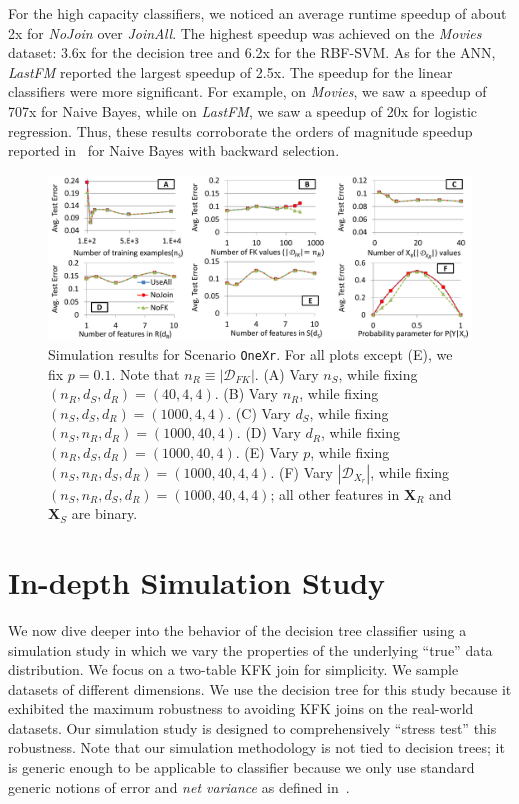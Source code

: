 \documentclass{vldb}
\begin{document}
For the high capacity classifiers, we noticed an average runtime speedup of about 2x for \textit{NoJoin} over \textit{JoinAll}.  The highest speedup was 
achieved on the \textit{Movies} dataset: 3.6x for the decision tree and 6.2x for the RBF-SVM. As for the ANN, \textit{LastFM} reported the 
largest speedup of 2.5x. 
The speedup for the linear classifiers were more significant. For example, on \textit{Movies}, we saw a speedup of 707x for Naive Bayes, while on 
\textit{LastFM}, we saw a speedup of 20x for logistic regression. Thus, these results corroborate the orders of magnitude speedup reported in~\cite{hamlet} 
for Naive Bayes with backward selection.


\begin{figure}[t]
\centering
\includegraphics[width=0.92\linewidth]{onexr.pdf}
\vspace{2mm}
\caption{Simulation results for Scenario \texttt{OneXr}. For all plots except (E), we fix $p = 0.1$. Note that $n_R \equiv |\mathcal{D}_{FK}|$.
(A) Vary $n_S$, while fixing $(n_R, d_S, d_R) = (40, 4, 4)$.
(B) Vary $n_R$, while fixing $(n_S, d_S, d_R) = (1000, 4, 4)$.
(C) Vary $d_S$, while fixing $(n_S, n_R, d_R) = (1000, 40, 4)$.
(D) Vary $d_R$, while fixing $(n_R, d_S, d_R) = (1000, 40, 4)$.
(E) Vary $p$,  while fixing $(n_S, n_R, d_S, d_R) = (1000, 40, 4, 4)$.
(F) Vary $|\mathcal{D}_{X_r}|$, while fixing $(n_S, n_R, d_S, d_R) = (1000, 40, 4, 4)$; all other features in $\textbf{X}_R$ and $\textbf{X}_S$ are binary.
}
\label{Figure:OneXrSimulation}
\end{figure}

\section{In-depth Simulation Study}	

We now dive deeper into the behavior of the decision tree classifier using a simulation study in which we vary the properties of the 
underlying ``true'' data distribution. We focus on a two-table KFK join for simplicity. We sample datasets of different dimensions.
We use the decision tree for this study because it exhibited the maximum robustness to avoiding KFK joins on the real-world datasets.
Our simulation study is designed to comprehensively ``stress test'' this robustness.
Note that our simulation methodology is not tied to decision trees; it is generic enough to be applicable to classifier because we only 
use standard generic notions of error and \textit{net variance} as defined in~\cite{hamlet}.
\end{document}
